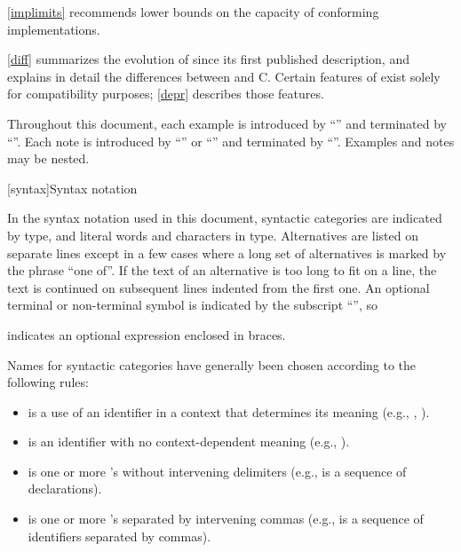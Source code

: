 \pnum
\ref{implimits} recommends lower bounds on the capacity of conforming
implementations.

\pnum
\ref{diff} summarizes the evolution of \Cpp{} since its first
published description, and explains in detail the differences between
\Cpp{} and C\@. Certain features of \Cpp{} exist solely for compatibility
purposes; \ref{depr} describes those features.

\pnum
Throughout this document, each example is introduced by
``'' and terminated by ``''. Each note is
introduced by ``'' or ``'' and
terminated by ``''. Examples
and notes may be nested.%

[syntax]{Syntax notation}

\pnum
{}%
In the syntax notation used in this document, syntactic
categories are indicated by  type, and literal words
and characters in   type. Alternatives are
listed on separate lines except in a few cases where a long set of
alternatives is marked by the phrase ``one of''. If the text of an alternative is too long to fit on a line, the text is continued on subsequent lines indented from the first one.
An optional terminal or non-terminal symbol is indicated by the subscript
``\opt{\relax}'', so
\begin{ncbnf}
\terminal{\{}  \terminal{\}}
\end{ncbnf}
indicates an optional expression enclosed in braces.%

\pnum
Names for syntactic categories have generally been chosen according to
the following rules:
\begin{itemize}
\item {} is a use of an identifier in a context that
determines its meaning (e.g., ,
).
\item {} is an identifier with no context-dependent meaning
(e.g., ).
\item {} is one or more 's without intervening
delimiters (e.g.,  is a sequence of
declarations).
\item {} is one or more 's separated by
intervening commas (e.g.,  is a sequence of
identifiers separated by commas).
\end{itemize}%
